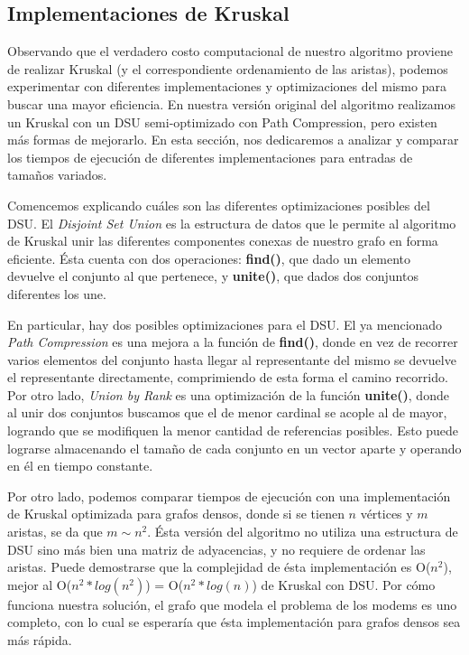 \newpage
\subsection{Implementaciones de Kruskal}
\vspace{1em}

Observando que el verdadero costo computacional de nuestro algoritmo proviene de realizar Kruskal (y el correspondiente ordenamiento de las aristas), podemos experimentar con diferentes implementaciones y optimizaciones del mismo para buscar una mayor eficiencia. En nuestra versión original del algoritmo realizamos un Kruskal con un DSU semi-optimizado con Path Compression, pero existen más formas de mejorarlo. En esta sección, nos dedicaremos a analizar y comparar los tiempos de ejecución de diferentes implementaciones para entradas de tamaños variados.

\vspace{1em}
Comencemos explicando cuáles son las diferentes optimizaciones posibles del DSU. El \textit{Disjoint Set Union} es la estructura de datos que le permite al algoritmo de Kruskal unir las diferentes componentes conexas de nuestro grafo en forma eficiente. Ésta cuenta con dos operaciones: \textbf{find()}, que dado un elemento devuelve el conjunto al que pertenece, y \textbf{unite()}, que dados dos conjuntos diferentes los une. 

\vspace{1em}
En particular, hay dos posibles optimizaciones para el DSU. El ya mencionado \textit{Path Compression} es una mejora a la función de \textbf{find()}, donde en vez de recorrer varios elementos del conjunto hasta llegar al representante del mismo se devuelve el representante directamente, comprimiendo de esta forma el camino recorrido. Por otro lado, \textit{Union by Rank} es una optimización de la función \textbf{unite()}, donde al unir dos conjuntos buscamos que el de menor cardinal se acople al de mayor, logrando que se modifiquen la menor cantidad de referencias posibles. Esto puede lograrse almacenando el tamaño de cada conjunto en un vector aparte y operando en él en tiempo constante.

\vspace{1em}
Por otro lado, podemos comparar tiempos de ejecución con una implementación de Kruskal optimizada para grafos densos, donde si se tienen $n$ vértices y $m$ aristas, se da que $m \sim n^2$. Ésta versión del algoritmo no utiliza una estructura de DSU sino más bien una matriz de adyacencias, y no requiere de ordenar las aristas. Puede demostrarse que la complejidad de ésta implementación es O($n^2$), mejor al O($n^2 * log(n^2)$) = O($n^2 * log(n)$) de Kruskal con DSU. Por cómo funciona nuestra solución, el grafo que modela el problema de los modems es uno completo, con lo cual se esperaría que ésta implementación para grafos densos sea más rápida.

